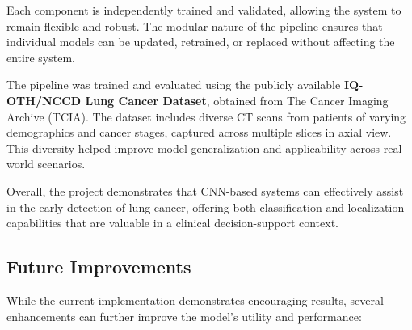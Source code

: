 Each component is independently trained and validated, allowing the system to remain flexible and 
robust. The modular nature of the pipeline ensures that individual models can be updated, retrained, 
or replaced without affecting the entire system.

The pipeline was trained and evaluated using the publicly available \textbf{IQ-OTH/NCCD Lung Cancer 
Dataset}, obtained from The Cancer Imaging Archive (TCIA). The dataset includes diverse CT scans 
from patients of varying demographics and cancer stages, captured across multiple slices in axial 
view. This diversity helped improve model generalization and applicability across real-world 
scenarios.

Overall, the project demonstrates that CNN-based systems can effectively assist in the early 
detection of lung cancer, offering both classification and localization capabilities that are 
valuable in a clinical decision-support context.


\subsection{Future Improvements}

While the current implementation demonstrates encouraging results, several enhancements can further 
improve the model’s utility and performance:

